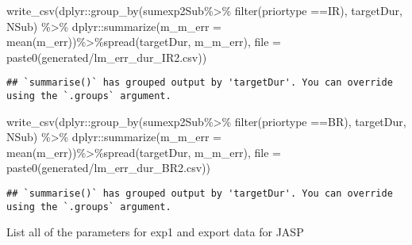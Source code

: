 \documentclass[
]{article}
\newenvironment{Shaded}{\begin{snugshade}}{\end{snugshade}}
\newcommand{\AttributeTok}[1]{\textcolor[rgb]{0.77,0.63,0.00}{#1}}
\newcommand{\FunctionTok}[1]{\textcolor[rgb]{0.00,0.00,0.00}{#1}}
\newcommand{\NormalTok}[1]{#1}
\newcommand{\SpecialCharTok}[1]{\textcolor[rgb]{0.00,0.00,0.00}{#1}}
\newcommand{\StringTok}[1]{\textcolor[rgb]{0.31,0.60,0.02}{#1}}
\begin{document}
\begin{Shaded}
\begin{Highlighting}[]
\FunctionTok{write\_csv}\NormalTok{(dplyr}\SpecialCharTok{::}\FunctionTok{group\_by}\NormalTok{(sumexp2Sub}\SpecialCharTok{\%\textgreater{}\%} \FunctionTok{filter}\NormalTok{(priortype }\SpecialCharTok{==}\StringTok{\textquotesingle{}IR\textquotesingle{}}\NormalTok{), targetDur, NSub) }\SpecialCharTok{\%\textgreater{}\%}
\NormalTok{  dplyr}\SpecialCharTok{::}\FunctionTok{summarize}\NormalTok{(}\AttributeTok{m\_m\_err =} \FunctionTok{mean}\NormalTok{(m\_err))}\SpecialCharTok{\%\textgreater{}\%}\FunctionTok{spread}\NormalTok{(targetDur, m\_m\_err), }\AttributeTok{file =} \FunctionTok{paste0}\NormalTok{(}\StringTok{\textquotesingle{}generated/lm\_err\_dur\_IR2.csv\textquotesingle{}}\NormalTok{))}
\end{Highlighting}
\end{Shaded}

\begin{verbatim}
## `summarise()` has grouped output by 'targetDur'. You can override using the `.groups` argument.
\end{verbatim}

\begin{Shaded}
\begin{Highlighting}[]
\FunctionTok{write\_csv}\NormalTok{(dplyr}\SpecialCharTok{::}\FunctionTok{group\_by}\NormalTok{(sumexp2Sub}\SpecialCharTok{\%\textgreater{}\%} \FunctionTok{filter}\NormalTok{(priortype }\SpecialCharTok{==}\StringTok{\textquotesingle{}BR\textquotesingle{}}\NormalTok{), targetDur, NSub) }\SpecialCharTok{\%\textgreater{}\%}
\NormalTok{  dplyr}\SpecialCharTok{::}\FunctionTok{summarize}\NormalTok{(}\AttributeTok{m\_m\_err =} \FunctionTok{mean}\NormalTok{(m\_err))}\SpecialCharTok{\%\textgreater{}\%}\FunctionTok{spread}\NormalTok{(targetDur, m\_m\_err), }\AttributeTok{file =} \FunctionTok{paste0}\NormalTok{(}\StringTok{\textquotesingle{}generated/lm\_err\_dur\_BR2.csv\textquotesingle{}}\NormalTok{))}
\end{Highlighting}
\end{Shaded}

\begin{verbatim}
## `summarise()` has grouped output by 'targetDur'. You can override using the `.groups` argument.
\end{verbatim}

List all of the parameters for exp1 and export data for JASP
\end{document}
